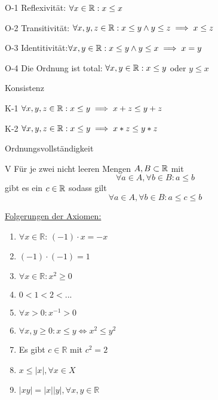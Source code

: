 \begin{description}
\begin{description}
    	\item{O-1} Reflexivität: $\forall x\in\mathbb{R}: x \leq x$
		\item{O-2} Transitivität: $\forall x,y,z\in\mathbb{R}: x\leq y \wedge y \leq z \implies x \leq z$
		\item{O-3} Identitivität:$\forall x,y \in\mathbb{R}: x \leq y \wedge y \leq x \implies x = y$
		\item{O-4} Die Ordnung ist total: $\forall x,y \in\mathbb{R}: x\leq y$ oder $y\leq x$
	\end{description}
    
    \item{Konsistenz}
	\begin{description}
    	\setlength\itemsep{0em} %
	
		\item{K-1} $\forall x,y,z\in\mathbb{R}: x\leq y \implies x+z \leq y+z$
        \item{K-2} $\forall x,y,z\in\mathbb{R}: x\leq y \implies x*z \leq y*z$
	\end{description}
    
    \item{Ordnungsvollständigkeit}
	\begin{description}
		\item{V} Für je zwei nicht leeren Mengen $A,B\subset\mathbb{R}$ mit 
        $$\forall a\in A, \forall b\in B: a\leq b$$
        gibt es ein $c\in\mathbb{R}$ sodass gilt
        $$\forall a\in A, \forall b\in B: a\leq c\leq b$$
	\end{description}
    
    \item{\underline{Folgerungen der Axiomen:}} 
    \begin{enumerate}
    \item $\forall x \in \mathbb{R}$: $(-1)\cdot x = -x$
	\item $(-1)\cdot (-1)=1$
	\item $\forall x \in \mathbb{R}: x^2 \geq 0$
	\item $0 < 1 < 2 < ...$
	\item $\forall x > 0: x^{-1} > 0$
	\item $\forall x,y \geq 0: x \leq y \Leftrightarrow x^2 \leq y^2$
	\item  Es gibt $c\in \mathbb{R}$ mit $c^2 = 2$
	\item  $x\leq |x|, \forall x \in X$
	\item  $|xy|=|x||y|, \forall x,y \in \mathbb{R}$
    
    
    \end{enumerate}
    
\end{description}

